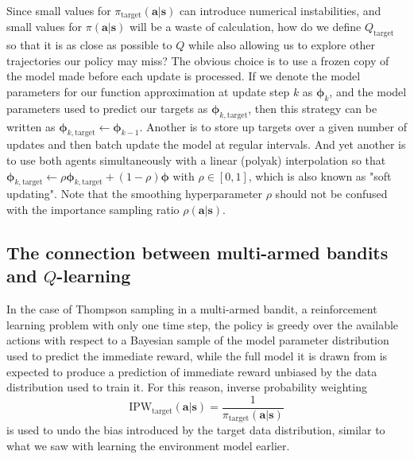 \documentclass{article}
\begin{document}
Since small values for $\pi_\text{target}(\mathbf{a}|\mathbf{s})$ can introduce numerical instabilities, and small values for $\pi(\mathbf{a}|\mathbf{s})$ will be a waste of calculation, how do we define $Q_\text{target}$ so that it is as close as possible to $Q$ while also allowing us to explore other trajectories our policy may miss? The obvious choice is to use a frozen copy of the model made before each update is processed. If we denote the model parameters for our function approximation at update step $k$  as $\boldsymbol{\phi}_k$, and the model parameters used to predict our targets as  $\boldsymbol{\phi}_{k,\text{target}}$, then this strategy can be written as $\boldsymbol{\phi}_{k,\text{target}}\leftarrow\boldsymbol{\phi}_{k-1}$.  Another is to store up targets over a given number of updates and then batch update the model at regular intervals. And yet another is to use both agents simultaneously with a linear (polyak) interpolation so that $\boldsymbol{\phi}_{k,\text{target}}\leftarrow \rho\boldsymbol{\phi}_{k,\text{target}}+(1-\rho)\boldsymbol{\phi}$ with $\rho\in[0,1]$, which is also known as "soft updating". Note that the smoothing hyperparameter $\rho$ should not be confused with the importance sampling ratio $\rho(\mathbf{a}|\mathbf{s})$.

\subsection{The connection between multi-armed bandits and $Q$-learning}

In the case of Thompson sampling in a multi-armed bandit, a reinforcement learning problem with only one time step, the policy is greedy over the available actions with respect to a Bayesian sample of the model parameter distribution used to predict the immediate reward, while the full model it is drawn from is expected to produce a prediction of immediate reward unbiased by the data distribution used to train it. For this reason, inverse probability weighting
\begin{equation}\text{IPW}_\text{target}( \mathbf{a}|\mathbf{s})=\frac{1}{\pi_\text{target}(\mathbf{a}|\mathbf{s})}\end{equation}is used to undo the bias introduced by the target data distribution, similar to what we saw with learning the environment model earlier. 
\end{document}
